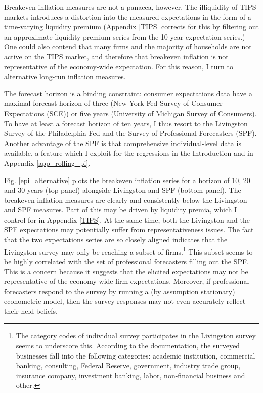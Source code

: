 \documentclass[11pt]{article}
\renewcommand{\[}{\begin{equation}}
\renewcommand{\]}{\end{equation}}
\begin{document}
Breakeven inflation measures are not a panacea, however. The illiquidity of TIPS markets introduces a distortion into the measured expectations in the form of a time-varying liquidity premium (Appendix \ref{TIPS} corrects for this by filtering out an approximate liquidity premium series from the 10-year expectation series.) One could also contend that many firms and the majority of households are not active on the TIPS market, and therefore that breakeven inflation is not representative of the economy-wide expectation. For this reason, I turn to alternative long-run inflation measures.

The forecast horizon is a binding constraint: consumer expectations data have a maximal forecast horizon of three (New York Fed Survey of Consumer Expectations (SCE)) or five years (University of Michigan Survey of Consumers). To have at least a forecast horizon of ten years, I thus resort to the Livingston Survey of the Philadelphia Fed and the Survey of Professional Forecasters (SPF). Another advantage of the SPF is that comprehensive individual-level data is available, a feature which I exploit for the regressions in the Introduction and in Appendix \ref{app_rolling_pi}. 

Fig. \ref{epi_alternative} plots the breakeven inflation series for a horizon of 10, 20 and 30 years (top panel) alongside Livingston and SPF (bottom panel). The breakeven inflation measures are clearly and consistently below the Livingston and SPF measures. Part of this may be driven by liquidity premia, which I control for in Appendix \ref{TIPS}. At the same time, both the Livingston and the SPF expectations may potentially suffer from representativeness issues. The fact that the two expectations series are so closely aligned indicates that the Livingston survey may only be reaching a subset of firms.\footnote{The category codes of individual survey participates in the Livingston survey seems to underscore this. According to the documentation, the surveyed businesses fall into the following categories: academic institution, commercial banking, consulting, Federal Reserve, government, industry trade group, insurance company, investment banking, labor, non-financial business and other.} This subset seems to be highly correlated with the set of professional forecasters filling out the SPF. This is a concern because it suggests that the elicited expectations may not be representative of the economy-wide firm expectations. Moreover, if professional forecasters respond to the survey by running a (by assumption stationary) econometric model, then the survey responses may not even accurately reflect their held beliefs.
\end{document}
